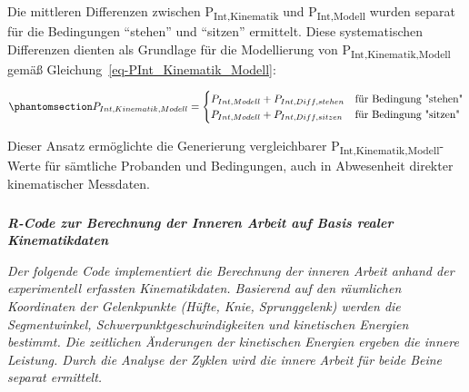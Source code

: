 \documentclass[
  letterpaper,
  DIV=11]{scrartcl}
\makeatletter
\let\oldsubparagraph\subparagraph
\renewcommand{\subparagraph}{
    \@ifstar
      \xxxSubParagraphStar
      \xxxSubParagraphNoStar
  }
\newcommand{\xxxSubParagraphStar}[1]{\oldsubparagraph*{#1}\mbox{}}
\newcommand{\xxxSubParagraphNoStar}[1]{\oldsubparagraph{#1}\mbox{}}
\makeatother
\begin{document}
Die mittleren Differenzen zwischen P\textsubscript{Int,Kinematik} und
P\textsubscript{Int,Modell} wurden separat für die Bedingungen
``stehen'' und ``sitzen'' ermittelt. Diese systematischen Differenzen
dienten als Grundlage für die Modellierung von
P\textsubscript{Int,Kinematik,Modell} gemäß
Gleichung~\ref{eq-PInt_Kinematik_Modell}:

\begin{equation}\phantomsection\label{eq-PInt_Kinematik_Modell}{
P_{Int,Kinematik,Modell} = 
\begin{cases} 
P_{Int,Modell} + P_{Int,Diff,stehen} & \text{für Bedingung "stehen"} \\
P_{Int,Modell} + P_{Int,Diff,sitzen} & \text{für Bedingung "sitzen"}
\end{cases}
}\end{equation}

Dieser Ansatz ermöglichte die Generierung vergleichbarer
P\textsubscript{Int,Kinematik,Modell}-Werte für sämtliche Probanden und
Bedingungen, auch in Abwesenheit direkter kinematischer Messdaten.

\subparagraph{\texorpdfstring{\textbf{\emph{R-Code zur Berechnung der
Inneren Arbeit auf Basis realer
Kinematikdaten}}}{R-Code zur Berechnung der Inneren Arbeit auf Basis realer Kinematikdaten}}\label{r-code-zur-berechnung-der-inneren-arbeit-auf-basis-realer-kinematikdaten}

\emph{Der folgende Code implementiert die Berechnung der inneren Arbeit
anhand der experimentell erfassten Kinematikdaten. Basierend auf den
räumlichen Koordinaten der Gelenkpunkte (Hüfte, Knie, Sprunggelenk)
werden die Segmentwinkel, Schwerpunktgeschwindigkeiten und kinetischen
Energien bestimmt. Die zeitlichen Änderungen der kinetischen Energien
ergeben die innere Leistung. Durch die Analyse der Zyklen wird die
innere Arbeit für beide Beine separat ermittelt.}
\end{document}
